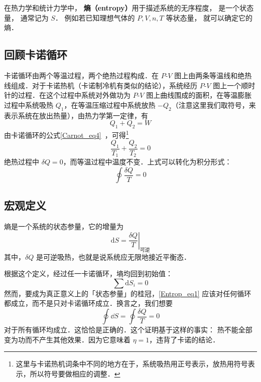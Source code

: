 
在热力学和统计力学中， \textbf{熵（entropy）}用于描述系统的无序程度， 是一个状态量， 通常记为 $S$． 例如若已知理想气体的 $P, V, n, T$ 等状态量， 就可以确定它的熵．

\subsection{回顾卡诺循环}

卡诺循环由两个等温过程，两个绝热过程构成．在 $P$-$V$ 图上由两条等温线和绝热线组成．对于卡诺热机（卡诺制冷机有类似的结论），系统经历 $P$-$V$ 图上一个顺时针的过程．在这个过程中系统对外做功为 $P$-$V$ 图上曲线围成的面积，在等温膨胀过程中系统吸热 $Q_1$，在等温压缩过程中系统放热 $-Q_2$（注意这里我们取符号，来表示系统在放出热量），由热力学第一定律，有
\begin{equation}
Q_1+Q_2=W
\end{equation}
由卡诺循环的公式\autoref{Carnot_eq4}~，可得\footnote{这里与卡诺热机词条中不同的地方在于，系统吸热用正号表示，放热用符号表示，所以符号要做相应的调整．}
\begin{equation}
\frac{Q_1}{T_1}+\frac{Q_2}{T_2}=0
\end{equation}
绝热过程中 $\delta Q=0$，而等温过程中温度不变．上式可以转化为积分形式：
\begin{equation}
\oint \frac{\delta Q}{T}=0
\end{equation}

\subsection{宏观定义}

熵是一个系统的状态参量，它的增量为
\begin{equation}
\mathrm{d} S = \left . \frac{\delta Q}{T}\right |_{\text{可逆}}
\end{equation}
其中，$\delta Q$ 是可逆吸热，也就是说系统应无限地接近平衡态．

根据这个定义，经过任一卡诺循环，墒均回到初始值：
\begin{equation} \label{Entrop_eq1}
\sum{\text{d}S_i=0}
\end{equation}
然而，要成为真正意义上的「状态参量」的桂冠，\autoref{Entrop_eq1} 应该对任何循环都成立，而不是只对卡诺循环成立．换言之，我们想要
\begin{equation}
\oint \dd S =\oint \frac{\delta Q}{T}=0
\end{equation}
对于所有循环均成立．这恰恰是正确的．这个证明基于这样的事实： 热不能全部变为功而不产生其他效果．因为它意味着 $\eta=1$，违背了卡诺的结论．

